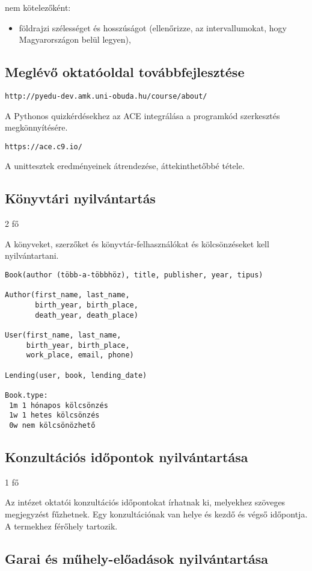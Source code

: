 \documentclass[a4paper]{article}
\begin{document}
nem kötelezőként:
\begin{itemize}
    \item földrajzi szélességet és hosszúságot (ellenőrizze, az intervallumokat,
	hogy Magyarországon belül legyen),
\end{itemize}

\subsection{Meglévő oktatóoldal továbbfejlesztése}

\verb+http://pyedu-dev.amk.uni-obuda.hu/course/about/+

A Pythonos quizkérdésekhez az ACE integrálása a programkód szerkesztés
megkönnyítésére.

\verb+https://ace.c9.io/+

A unittesztek eredményeinek átrendezése, áttekinthetőbbé tétele.

\subsection{Könyvtári nyilvántartás}

2 fő

A könyveket, szerzőket és könyvtár-felhasználókat és kölcsönzéseket kell
nyilvántartani.


\begin{verbatim}
Book(author (több-a-többhöz), title, publisher, year, tipus)

Author(first_name, last_name,
       birth_year, birth_place,
       death_year, death_place)

User(first_name, last_name,
     birth_year, birth_place,
     work_place, email, phone)

Lending(user, book, lending_date)

Book.type:
 1m 1 hónapos kölcsönzés
 1w 1 hetes kölcsönzés
 0w nem kölcsönözhető
\end{verbatim}

\subsection{Konzultációs időpontok nyilvántartása}

1 fő

Az intézet oktatói konzultációs időpontokat írhatnak ki, melyekhez
szöveges megjegyzést fűzhetnek. Egy konzultációnak van helye és kezdő és
végső időpontja. A termekhez férőhely tartozik.

\subsection{Garai és műhely-előadások nyilvántartása}
\end{document}
